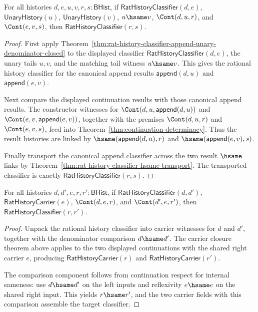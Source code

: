 \begin{theorem}
\label{thm:field-rat-denominator-continuation-classifier-closure}
For all histories $d,e,u,v,r,s:\mathsf{BHist}$, if
$\mathsf{RatHistoryClassifier}(d,e)$, $\mathsf{UnaryHistory}(u)$,
$\mathsf{UnaryHistory}(v)$, $u\hsame v$, $\Cont(d,u,r)$, and
$\Cont(e,v,s)$, then $\mathsf{RatHistoryClassifier}(r,s)$.
\end{theorem}
\begin{proof}
First apply
Theorem~\ref{thm:rat-history-classifier-append-unary-denominator-closed} to
the displayed classifier $\mathsf{RatHistoryClassifier}(d,e)$, the unary tails
$u,v$, and the matching tail witness $u\hsame v$. This gives the rational
history classifier for the canonical append results
$\mathsf{append}(d,u)$ and $\mathsf{append}(e,v)$.

Next compare the displayed continuation results with those canonical append
results. The constructor witnesses for
$\Cont(d,u,\mathsf{append}(d,u))$ and
$\Cont(e,v,\mathsf{append}(e,v))$, together with the premises
$\Cont(d,u,r)$ and $\Cont(e,v,s)$, feed into
Theorem~\ref{thm:continuation-determinacy}. Thus the result histories are
linked by $\hsame(\mathsf{append}(d,u),r)$ and
$\hsame(\mathsf{append}(e,v),s)$.

Finally transport the canonical append classifier across the two result
$\hsame$ links by
Theorem~\ref{thm:rat-history-classifier-hsame-transport}. The transported
classifier is exactly $\mathsf{RatHistoryClassifier}(r,s)$.
\end{proof}

\begin{theorem}
\label{thm:field-rat-classifier-continuation-right-closed}
For all histories $d,d',e,r,r':\mathsf{BHist}$, if
$\mathsf{RatHistoryClassifier}(d,d')$, $\mathsf{RatHistoryCarrier}(e)$,
$\Cont(d,e,r)$, and $\Cont(d',e,r')$, then
$\mathsf{RatHistoryClassifier}(r,r')$.
\end{theorem}
\begin{proof}
Unpack the rational history classifier into carrier witnesses for $d$ and
$d'$, together with the denominator comparison $d\hsame d'$. The carrier
closure theorem above applies to the two displayed continuations with the
shared right carrier $e$, producing $\mathsf{RatHistoryCarrier}(r)$ and
$\mathsf{RatHistoryCarrier}(r')$.

The comparison component follows from continuation respect for internal
sameness: use $d\hsame d'$ on the left inputs and reflexivity $e\hsame e$ on
the shared right input. This yields $r\hsame r'$, and the two carrier fields
with this comparison assemble the target classifier.
\end{proof}

